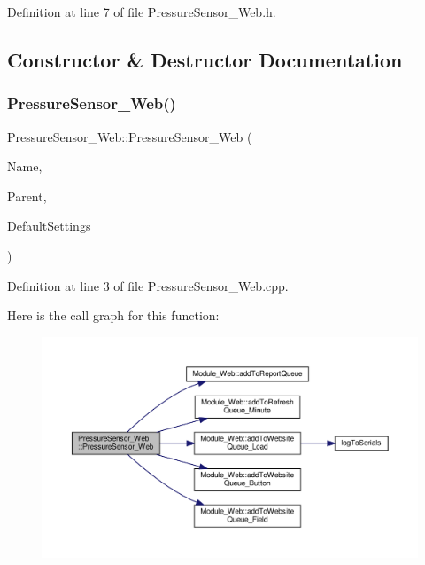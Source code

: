 Definition at line 7 of file Pressure\+Sensor\+\_\+\+Web.\+h.



\subsection{Constructor \& Destructor Documentation}
\mbox{\label{class_pressure_sensor___web_a5e59489e44f997ccf238b24af8b4e0fa}} 
\subsubsection{\texorpdfstring{Pressure\+Sensor\+\_\+\+Web()}{PressureSensor\_Web()}}
{\footnotesize\ttfamily Pressure\+Sensor\+\_\+\+Web\+::\+Pressure\+Sensor\+\_\+\+Web (\begin{DoxyParamCaption}\item[{const \+\_\+\+\_\+\+Flash\+String\+Helper $\ast$}]{Name,  }\item[{\hyperlink{class_module___web}{Module\+\_\+\+Web} $\ast$}]{Parent,  }\item[{\hyperlink{struct_settings_1_1_pressure_sensor_settings}{Settings\+::\+Pressure\+Sensor\+Settings} $\ast$}]{Default\+Settings }\end{DoxyParamCaption})}



Definition at line 3 of file Pressure\+Sensor\+\_\+\+Web.\+cpp.

Here is the call graph for this function\+:
\nopagebreak
\begin{figure}[H]
\begin{center}
\leavevmode
\includegraphics[width=350pt]{class_pressure_sensor___web_a5e59489e44f997ccf238b24af8b4e0fa_cgraph}
\end{center}
\end{figure}


